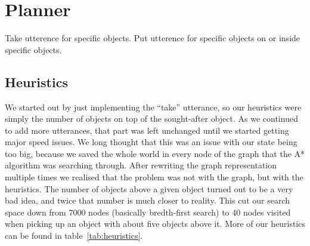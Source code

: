 \section*{Planner}
Take utterence for specific objects.
Put utterence for specific objects on or inside specific objects.

\subsection*{Heuristics}
We started out by just implementing the ``take'' utterance, so our heuristics
were simply the number of objects on top of the sought-after object. As we
continued to add more utterances, that part was left unchanged until we started
getting major speed issues. We long thought that this was an issue with our
state being too big, because we saved the whole world in every node of the
graph that the A* algorithm was searching through. After rewriting the graph
representation multiple times we realised that the problem was not with the
graph, but with the heuristics. The number of objects above a given object
turned out to be a very bad idea, and twice that number is much closer to
reality. This cut our search space down from 7000 nodes (basically bredth-first
search) to 40 nodes visited when picking up an object with about five objects
above it. More of our heuristics can be found in table~\ref{tab:heuristics}.

